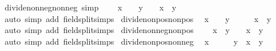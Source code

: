 \begin{isabellebody}
\isanewline
{}\isamarkupfalse%
\ divide{\isacharunderscore}{\kern0pt}nonneg{\isacharunderscore}{\kern0pt}nonneg\ {\isacharbrackleft}{\kern0pt}simp{\isacharbrackright}{\kern0pt}{\isacharcolon}{\kern0pt}\isanewline
\ \ {\isachardoublequoteopen}{}\ {\isasymle}\ x\ {\isasymLongrightarrow}\ {}\ {\isasymle}\ y\ {\isasymLongrightarrow}\ {}\ {\isasymle}\ x\ {\isacharslash}{\kern0pt}\ y{\isachardoublequoteclose}\isanewline
%
\isadelimproof
\ \ %
\endisadelimproof
%
\isatagproof
{}\isamarkupfalse%
\ {\isacharparenleft}{\kern0pt}auto\ simp\ add{\isacharcolon}{\kern0pt}\ field{\isacharunderscore}{\kern0pt}split{\isacharunderscore}{\kern0pt}simps{\isacharparenright}{\kern0pt}%
\endisatagproof
{\isafoldproof}%
%
\isadelimproof
\isanewline
%
\endisadelimproof
\isanewline
{}\isamarkupfalse%
\ divide{\isacharunderscore}{\kern0pt}nonpos{\isacharunderscore}{\kern0pt}nonpos{\isacharcolon}{\kern0pt}\isanewline
\ \ {\isachardoublequoteopen}x\ {\isasymle}\ {}\ {\isasymLongrightarrow}\ y\ {\isasymle}\ {}\ {\isasymLongrightarrow}\ {}\ {\isasymle}\ x\ {\isacharslash}{\kern0pt}\ y{\isachardoublequoteclose}\isanewline
%
\isadelimproof
\ \ %
\endisadelimproof
%
\isatagproof
{}\isamarkupfalse%
\ {\isacharparenleft}{\kern0pt}auto\ simp\ add{\isacharcolon}{\kern0pt}\ field{\isacharunderscore}{\kern0pt}split{\isacharunderscore}{\kern0pt}simps{\isacharparenright}{\kern0pt}%
\endisatagproof
{\isafoldproof}%
%
\isadelimproof
\isanewline
%
\endisadelimproof
\isanewline
{}\isamarkupfalse%
\ divide{\isacharunderscore}{\kern0pt}nonneg{\isacharunderscore}{\kern0pt}nonpos{\isacharcolon}{\kern0pt}\isanewline
\ \ {\isachardoublequoteopen}{}\ {\isasymle}\ x\ {\isasymLongrightarrow}\ y\ {\isasymle}\ {}\ {\isasymLongrightarrow}\ x\ {\isacharslash}{\kern0pt}\ y\ {\isasymle}\ {}{\isachardoublequoteclose}\isanewline
%
\isadelimproof
\ \ %
\endisadelimproof
%
\isatagproof
{}\isamarkupfalse%
\ {\isacharparenleft}{\kern0pt}auto\ simp\ add{\isacharcolon}{\kern0pt}\ field{\isacharunderscore}{\kern0pt}split{\isacharunderscore}{\kern0pt}simps{\isacharparenright}{\kern0pt}%
\endisatagproof
{\isafoldproof}%
%
\isadelimproof
\isanewline
%
\endisadelimproof
\isanewline
{}\isamarkupfalse%
\ divide{\isacharunderscore}{\kern0pt}nonpos{\isacharunderscore}{\kern0pt}nonneg{\isacharcolon}{\kern0pt}\isanewline
\ \ {\isachardoublequoteopen}x\ {\isasymle}\ {}\ {\isasymLongrightarrow}\ {}\ {\isasymle}\ y\ {\isasymLongrightarrow}\ x\ {\isacharslash}{\kern0pt}\ y\ {\isasymle}\ {}{\isachardoublequoteclose}\isanewline

\end{isabellebody}
